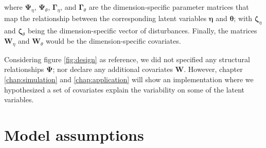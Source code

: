 \noindent where $\pmb{\Psi}_{\eta}$, $\pmb{\Psi}_{\theta}$, $\pmb{\Gamma}_{\eta}$, and $\pmb{\Gamma}_{\theta}$ are the dimension-specific parameter matrices that map the relationship between the corresponding latent variables $\pmb{\eta}$ and $\pmb{\theta}$; with  $\pmb{\zeta}_{\eta}$ and $\pmb{\zeta}_{\theta}$ being the dimension-specific vector of disturbances. Finally, the matrices $\mathbf{W}_{\eta}$ and $\mathbf{W}_{\theta}$ would be the dimension-specific covariates. 

Considering figure \ref{fig:design} as reference, we did not specified any structural relationships $\pmb{\Psi}$; nor declare any additional covariates $\mathbf{W}$. However, chapter \ref{chap:simulation} and \ref{chap:application} will show an implementation where we hypothesized a set of covariates explain the variability on some of the latent variables.


\section{Model assumptions} \label{s_sect:assump}

